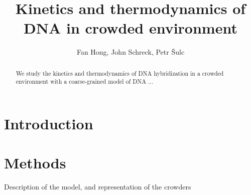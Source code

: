 \documentclass[]{article}
\title{Kinetics and thermodynamics of DNA in crowded environment}
\author{Fan Hong, John Schreck, Petr \v{S}ulc}
\begin{document}
\maketitle

\begin{abstract}
We study the kinetics and thermodynamics of DNA hybridization in a crowded environment with a coarse-grained model of DNA ...
\end{abstract}

\section{Introduction}

\section{Methods}
Description of the model, and representation of the crowders
\end{document}
